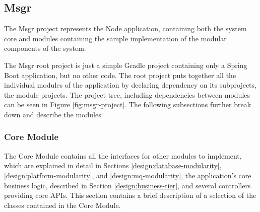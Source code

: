 \subsection{Msgr}
The Msgr project represents the Node application, containing both the system core and modules containing the sample implementation of the modular components of the system. 

The Msgr root project is just a simple Gradle project containing only a Spring Boot application, but no other code. The root project puts together all the individual modules of the application by declaring dependency on its subprojects, the module projects. The project tree, including dependencies between modules can be seen in Figure \ref{fig:msgr-project}. The following subsections further break down and describe the modules.

\subsubsection{Core Module}
The Core Module contains all the interfaces for other modules to implement, which are explained in detail in Sections \ref{design:database-modularity}, \ref{design:platform-modularity}, and \ref{design:mq-modularity}, the application's core business logic, described in Section \ref{design:business-tier}, and several controllers providing core APIs. This section contains a brief description of a selection of the classes contained in the Core Module.

